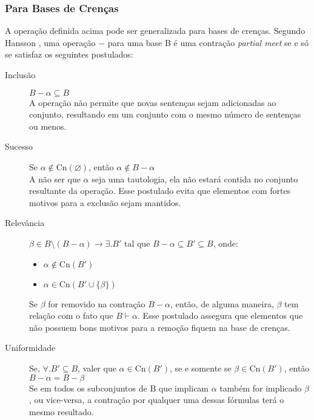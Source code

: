 \subsubsection{Para Bases de Crenças}

A operação definida acima pode ser generalizada para bases de crenças. Segundo Hansson \cite{revisaoHansson2}, uma operação $ - $ para uma base B é uma contração \textit{partial meet} se e só se satisfaz os seguintes postulados:

\begin{description}
	\item[Inclusão] $ B - \alpha \subseteq B$ \\ A operação não permite que novas sentenças sejam adicionadas ao conjunto, resultando em um conjunto com o mesmo número de sentenças ou menos.
	\item[Sucesso] Se $ \alpha \notin \text{Cn}(\varnothing) $, então $ \alpha \notin B - \alpha $ \\ A não ser que $ \alpha $ seja uma tautologia, ela não estará contida no conjunto resultante da operação. Esse postulado evita que elementos com fortes motivos para a exclusão sejam mantidos.
	\item[Relevância] $ \beta \in B \setminus (B - \alpha) \to \exists. B' \text{ tal que } B - \alpha \subseteq B' \subseteq B $, onde:
	\begin{itemize}
		\item $ \alpha \notin \text{Cn}(B') $
		\item $ \alpha \in \text{Cn}(B' \cup \{\beta\}) $ 
	\end{itemize}
	Se $ \beta $ for removido na contração $ B - \alpha $, então, de alguma maneira, $ \beta $ tem relação com o fato que $ B \vdash \alpha$. Esse postulado assegura que elementos que não possuem bons motivos para a remoção fiquem na base de crenças.
	\item[Uniformidade] Se, $ \forall.B' \subseteq B $, valer que $ \alpha \in \text{Cn}(B') $, se e somente se $ \beta \in \text{Cn}(B') $, então $ B - \alpha = B - \beta $ \\
	Se em todos os subconjuntos de B que implicam $ \alpha $ também for implicado $ \beta $, ou vice-versa, a contração por qualquer uma dessas fórmulas terá o mesmo resultado.
\end{description}